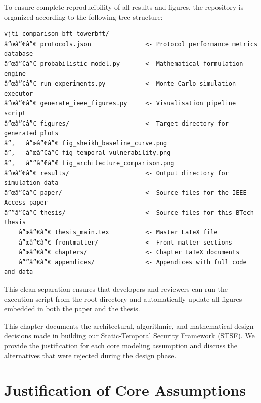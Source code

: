 \documentclass[12pt, oneside, a4paper]{report}
\theoremstyle{definition}
\theoremstyle{remark}
\begin{document}
To ensure complete reproducibility of all results and figures, the repository is organized according to the following tree structure:

\begin{verbatim}
vjti-comparison-bft-towerbft/
â”œâ”€â”€ protocols.json               <- Protocol performance metrics database
â”œâ”€â”€ probabilistic_model.py       <- Mathematical formulation engine
â”œâ”€â”€ run_experiments.py           <- Monte Carlo simulation executor
â”œâ”€â”€ generate_ieee_figures.py     <- Visualisation pipeline script
â”œâ”€â”€ figures/                     <- Target directory for generated plots
â”‚   â”œâ”€â”€ fig_sheikh_baseline_curve.png
â”‚   â”œâ”€â”€ fig_temporal_vulnerability.png
â”‚   â””â”€â”€ fig_architecture_comparison.png
â”œâ”€â”€ results/                     <- Output directory for simulation data
â”œâ”€â”€ paper/                       <- Source files for the IEEE Access paper
â””â”€â”€ thesis/                      <- Source files for this BTech thesis
    â”œâ”€â”€ thesis_main.tex          <- Master LaTeX file
    â”œâ”€â”€ frontmatter/             <- Front matter sections
    â”œâ”€â”€ chapters/                <- Chapter LaTeX documents
    â””â”€â”€ appendices/              <- Appendices with full code and data
\end{verbatim}

This clean separation ensures that developers and reviewers can run the execution script from the root directory and automatically update all figures embedded in both the paper and the thesis.




This chapter documents the architectural, algorithmic, and mathematical design decisions made in building our Static-Temporal Security Framework (STSF). We provide the justification for each core modeling assumption and discuss the alternatives that were rejected during the design phase.

\section{Justification of Core Assumptions}
\label{sec:dd:justification}
\end{document}
